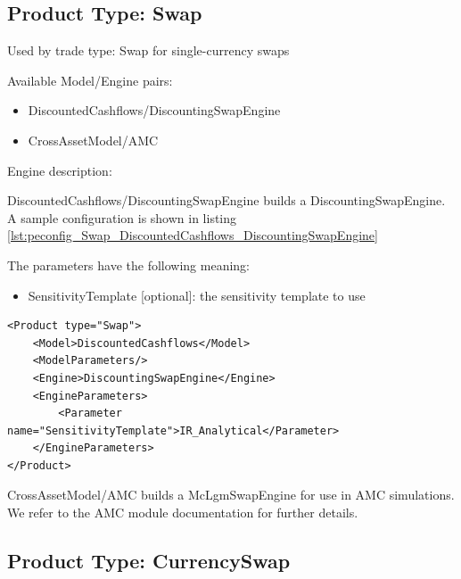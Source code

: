 \subsection{Product Type: Swap}

Used by trade type: Swap for single-currency swaps

Available Model/Engine pairs:

\begin{itemize}
\item DiscountedCashflows/DiscountingSwapEngine
\item CrossAssetModel/AMC
\end{itemize}

Engine description:

DiscountedCashflows/DiscountingSwapEngine builds a DiscountingSwapEngine. A sample configuration is shown in listing
\ref{lst:peconfig_Swap_DiscountedCashflows_DiscountingSwapEngine}

The parameters have the following meaning:

\begin{itemize}
\item SensitivityTemplate [optional]: the sensitivity template to use
\end{itemize}

\begin{longlisting}
\begin{verbatim}
<Product type="Swap">
    <Model>DiscountedCashflows</Model>
    <ModelParameters/>
    <Engine>DiscountingSwapEngine</Engine>
    <EngineParameters>
        <Parameter name="SensitivityTemplate">IR_Analytical</Parameter>
    </EngineParameters>
</Product>
\end{verbatim}
\caption{Configuration for Product Swap, Model DiscountedCashflows, Engine DiscountingSwapEngine}
\label{lst:peconfig_Swap_DiscountedCashflows_DiscountingSwapEngine}
\end{longlisting}

CrossAssetModel/AMC builds a McLgmSwapEngine for use in AMC simulations. We refer to the AMC module documentation for
further details.

\subsection{Product Type: CurrencySwap}

